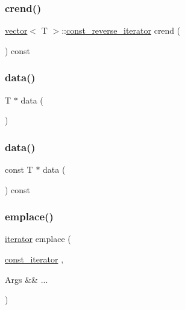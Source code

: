 \subsubsection{\texorpdfstring{crend()}{crend()}}
{\footnotesize\ttfamily \mbox{\hyperlink{classvector}{vector}}$<$ T $>$\+::\mbox{\hyperlink{classvector_a421ef78ccdc84f0f6b2b14e2732527ba}{const\+\_\+reverse\+\_\+iterator}} crend (\begin{DoxyParamCaption}{ }\end{DoxyParamCaption}) const\hspace{0.3cm}{\ttfamily [noexcept]}}

\mbox{\label{classvector_a9eaee4e9a7b7b5ea5372a3c7aae5b262}} 
\subsubsection{\texorpdfstring{data()}{data()}\hspace{0.1cm}{\footnotesize\ttfamily [1/2]}}
{\footnotesize\ttfamily T $\ast$ data (\begin{DoxyParamCaption}{ }\end{DoxyParamCaption})\hspace{0.3cm}{\ttfamily [noexcept]}}

\mbox{\label{classvector_a350019eabadc6614a86aab52ae90af14}} 
\subsubsection{\texorpdfstring{data()}{data()}\hspace{0.1cm}{\footnotesize\ttfamily [2/2]}}
{\footnotesize\ttfamily const T $\ast$ data (\begin{DoxyParamCaption}{ }\end{DoxyParamCaption}) const\hspace{0.3cm}{\ttfamily [noexcept]}}

\mbox{\label{classvector_a055780ddd711b193bc16b1b29c24d04f}} 
\subsubsection{\texorpdfstring{emplace()}{emplace()}\hspace{0.1cm}{\footnotesize\ttfamily [1/2]}}
{\footnotesize\ttfamily \mbox{\hyperlink{classvector_a35c955cacac6aacaa1e82874b1628865}{iterator}} emplace (\begin{DoxyParamCaption}\item[{\mbox{\hyperlink{classvector_a2fc97dce62b7053449cc868607540dba}{const\+\_\+iterator}}}]{,  }\item[{Args \&\&}]{... }\end{DoxyParamCaption})}

